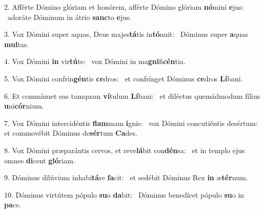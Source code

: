 2. Afférte Dómino glóriam et honórem, afférte Dómino glóriam \textbf{nó}mini \textbf{e}jus: \ast\  adoráte Dóminum in átrio \textbf{sanc}to \textbf{e}jus.\

3. Vox Dómini super aquas, Deus majes\textbf{tá}tis in\textbf{tó}nuit: \ast\  Dóminus super \textbf{a}quas \textbf{mul}tas.\

4. Vox Dómini \textbf{in} vir\textbf{tú}te: \ast\  vox Dómini in ma\textbf{gni}fi\textbf{cén}tia.\

5. Vox Dómini confrin\textbf{gén}tis \textbf{ce}dros: \ast\  et confrínget Dóminus \textbf{ce}dros \textbf{Lí}bani.\

6. Et commínuet eas tamquam \textbf{ví}tulum \textbf{Lí}bani: \ast\  et diléctus quemádmodum fílius \textbf{u}ni\textbf{cór}nium.\

7. Vox Dómini intercidéntis \textbf{flam}mam \textbf{i}gnis: \ast\  vox Dómini concutiéntis desértum: et commovébit Dóminus de\textbf{sér}tum \textbf{Ca}des.\

8. Vox Dómini præparántis cervos, et reve\textbf{lá}bit con\textbf{dén}sa: \ast\  et in templo ejus omnes \textbf{di}cent \textbf{gló}riam.\

9. Dóminus dilúvium inhabi\textbf{tá}re \textbf{fa}cit: \ast\  et sedébit Dóminus Rex \textbf{in} æ\textbf{tér}num.\

10. Dóminus virtútem pópulo \textbf{su}o \textbf{da}bit: \ast\  Dóminus benedícet pópulo \textbf{su}o in \textbf{pa}ce.\

